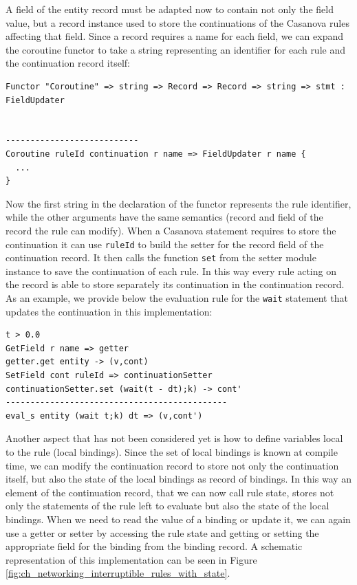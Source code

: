 A field of the entity record must be adapted now to contain not only the field value, but a record instance used to store the continuations of the Casanova rules affecting that field. Since a record requires a name for each field, we can expand the coroutine functor to take a string representing an identifier for each rule and the continuation record itself:

\begin{lstlisting}
Functor "Coroutine" => string => Record => Record => string => stmt : FieldUpdater


---------------------------
Coroutine ruleId continuation r name => FieldUpdater r name {
  ...
}
\end{lstlisting}

\noindent
Now the first string in the declaration of the functor represents the rule identifier, while the other arguments have the same semantics (record and field of the record the rule can modify). When a Casanova statement requires to store the continuation it can use \texttt{ruleId} to build the setter for the record field of the continuation record. It then calls the function \texttt{set} from the setter module instance to save the continuation of each rule. In this way every rule acting on the record is able to store separately its continuation in the continuation record. As an example, we provide below the evaluation rule for the \texttt{wait} statement that updates the continuation in this implementation:

\begin{lstlisting}
t > 0.0
GetField r name => getter
getter.get entity -> (v,cont)
SetField cont ruleId => continuationSetter
continuationSetter.set (wait(t - dt);k) -> cont'
---------------------------------------------
eval_s entity (wait t;k) dt => (v,cont')
\end{lstlisting}

\noindent
Another aspect that has not been considered yet is how to define variables local to the rule (local bindings). Since the set of local bindings is known at compile time, we can modify the continuation record to store not only the continuation itself, but also the state of the local bindings as record of bindings. In this way an element of the continuation record, that we can now call rule state, stores not only the statements of the rule left to evaluate but also the state of the local bindings. When we need to read the value of a binding or update it, we can again use a getter or setter by accessing the rule state and getting or setting the appropriate field for the binding from the binding record. A schematic representation of this implementation can be seen in Figure \ref{fig:ch_networking_interruptible_rules_with_state}.

